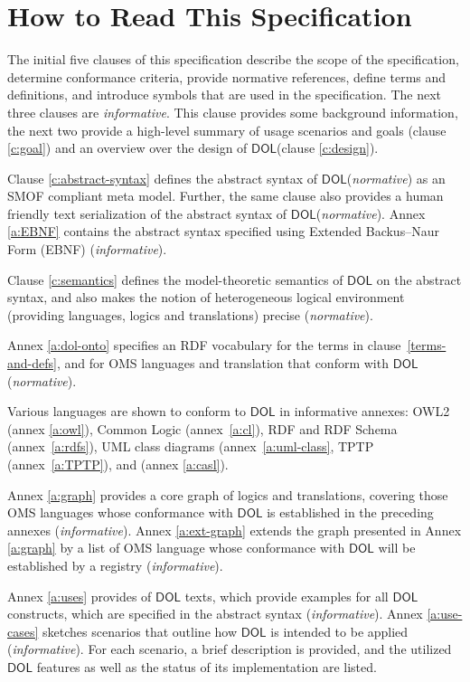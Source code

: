 \documentclass[10pt,fleqn,final]{scrreprt}
\newcommand{\cbs}[0]{\color{red}\xspace} %
\newcommand{\cbe}[0]{\color{black}\xspace} %
\newcommand*{\DOL}{\ensuremath{\mathsf{DOL}}\xspace}
\newenvironment{definitions}[0]{\medskip }{}
\begin{document}
\begin{definitions}
\section{How to Read This Specification}
\cbs
The initial five clauses of this specification describe the scope of the specification, determine conformance criteria, provide normative references, define terms and definitions, and introduce symbols that are used in the specification. 
The next three clauses are \emph{informative}. This clause provides some background information, the next two provide a high-level
 summary of usage scenarios and goals (clause \ref{c:goal}) and an overview over the design of
\DOL  (clause \ref{c:design}).
\cbe

\medskip \noindent 
\cbs
Clause \ref{c:abstract-syntax} defines the abstract syntax of \DOL (\emph{normative}) as an SMOF compliant meta model.\cbe
Further, \cbs the same clause also\cbe provides a human friendly text serialization of the abstract syntax of 
\DOL (\emph{normative}). 
\cbs
Annex \ref{a:EBNF} contains the abstract syntax specified using Extended
Backus–Naur Form (EBNF) \cbe
(\emph{informative}).

\medskip \noindent Clause \ref{c:semantics} defines the
model-theoretic semantics of \DOL on the abstract syntax, and also
makes the notion of heterogeneous logical environment (providing
languages, logics and translations) precise (\emph{normative}).

\medskip \noindent Annex \ref{a:dol-onto} specifies an RDF vocabulary for
the terms in clause~\ref{terms-and-defs}, and for OMS languages and
translation that conform with \DOL  (\emph{normative}).

\medskip \noindent Various languages are shown to  conform to \DOL in
informative annexes: OWL2 (annex \ref{a:owl}), Common Logic
(annex~\ref{a:cl}), RDF and RDF Schema (annex~\ref{a:rdfs}), UML class
diagrams (annex~\ref{a:uml-class}, TPTP (annex~\ref{a:TPTP}), and
\CASL (annex \ref{a:casl}).

\medskip \noindent 
Annex \ref{a:graph}  provides a core graph of logics and translations, covering those OMS languages
whose conformance with \DOL is established in the preceding annexes (\emph{informative}). 
Annex \ref{a:ext-graph} extends the graph presented in Annex \ref{a:graph}  by a list of OMS
language whose conformance with \DOL will be established by a registry
(\emph{informative}).

\medskip \noindent 
Annex \ref{a:uses} provides of \DOL texts, which provide examples for all \DOL constructs, which 
are specified in the abstract syntax 
(\emph{informative}).
Annex \ref{a:use-cases} sketches scenarios that outline how \DOL is intended to be applied \cbs (\emph{informative}). For 
each scenario,  a brief description  is provided, and the utilized \DOL features as well as the status of its implementation are listed.\cbe


\end{definitions}
\end{document}
